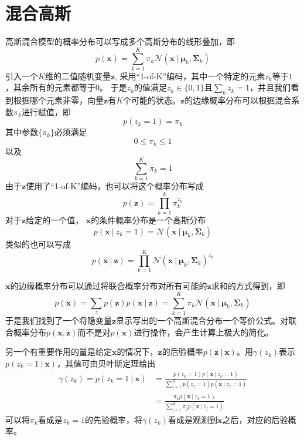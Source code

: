 \documentclass[11pt]{ctexbook}
\begin{document}
\section{混合高斯}
高斯混合模型的概率分布可以写成多个高斯分布的线形叠加，即
\begin{equation}
	p(\bm x) = \sum_{k=1}^{K}\pi_k\mathcal N(\bm x\ | \ \bm \mu_k, \bm \Sigma_k)
\end{equation}
引入一个$K$维的二值随机变量$\bm z$, 采用“1-of-K”编码，其中一个特定的元素$z_k$等于$1$，其余所有的元素都等于$0$。 于是$z_k$的值满足$z_k \in \{0, 1\}$且$\sum_k z_k = 1$，并且我们看到根据哪个元素非零，向量$\bm z$有$K$个可能的状态。$\bm z$的边缘概率分布可以根据混合系数$\pi_k$进行赋值，即
\begin{equation}
	p(z_k=1) = \pi_k
\end{equation}
其中参数$\{\pi_k\}$必须满足
\begin{equation}
	0 \leqslant \pi_k \leqslant 1
\end{equation}
以及
\begin{equation}
	\sum_{k=1}^{K} \pi_k = 1
\end{equation}
由于$\bm z$使用了“1-of-K”编码，也可以将这个概率分布写成
\begin{equation}
	p(\bm z) = \prod_{k=1}^{k}\pi_k^{z_k}
\end{equation}
对于$\bm z$给定的一个值， $\bm x$的条件概率分布是一个高斯分布
\begin{equation}
	p(\bm x\ |\  z_k= 1) = \mathcal N (\bm x\ |\ \bm \mu_k, \bm \Sigma_k )
\end{equation}
类似的也可以写成
\begin{equation}
	p(\bm x \ | \ \bm z) = \prod_{k=1}^{K} \mathcal N (\bm x \ |\ \bm \mu_k, \bm \Sigma_k ) ^ {z_k}
\end{equation}

$\bm x $的边缘概率分布可以通过将联合概率分布对所有可能的$\bm z$求和的方式得到，即
\begin{equation}
	p(\bm x) = \sum_z p(\bm z)p(\bm x \ |\ \bm z) = \sum_{k=1}^{K}\pi_k \mathcal N(\bm x \ |\ \bm \mu_k, \bm \Sigma_k)
\end{equation}
于是我们找到了一个将隐变量$\bm z$显示写出的一个高斯混合分布一个等价公式。对联合概率分布$p(\bm x, \bm z)$而不是对$p(\bm x)$进行操作，会产生计算上极大的简化。

另一个有重要作用的量是给定$\bm x$的情况下，$\bm z$的后验概率$p(\bm z\ |\ \bm x)$。用$\mathcal \gamma(z_k)$表示$p(z_k=1\ |\ \bm x)$，其值可由贝叶斯定理给出
\begin{align}
	\gamma(z_k) = p(z_k=1\ |\ \bm x) &= \frac{p(z_k=1)p(\bm x\ |\ z_k=1)}{\sum_{j=1}^{K}p(z_j=1)p(\bm x\ |\ z_j=1)} \\
									 &= \frac{\pi_k p(\bm x\ |\ z_k=1)}{\sum_{j=1}^{K}\pi_j p(\bm x\ |\ z_j=1)} 
\end{align}
可以将$\pi_k$看成是$z_k=1$的先验概率，将$\gamma(z_k)$看成是观测到$\bm x$之后，对应的后验概率。
\end{document}
